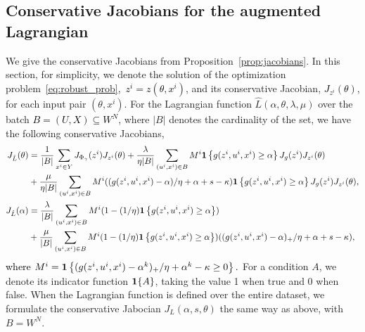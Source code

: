 \documentclass[11pt]{article}
\newcommand{\bsnote}[1]{\noindent\textcolor{red}{\texttt{Bartolomeo: #1}}}
\newcommand{\RC}[1]{\textcolor{black}{#1}}
\begin{document}
\begin{appendices}

\section{Conservative Jacobians for the augmented Lagrangian}
\label{appx:jacobians}
We give the conservative Jacobians from Proposition~\ref{prop:jacobians}. 
In this section, for simplicity,  we denote the solution of the optimization problem~\eqref{eq:robust_prob},~\RC{$z^i = z(\theta,x^i)$}, and its conservative Jacobian, \RC{$ J_{z^i}(\theta)$}, for each input pair $(\theta, x^i)$. 
For the Lagrangian function $\hat{L}(\alpha,\theta,\lambda, \mu)$ over the batch \RC{$B = (U,X) \subseteq W^N$}, where $|B|$ denotes the cardinality of the set, we have the following conservative Jacobians,
\RC{\allowdisplaybreaks \begin{align*}
J_{\hat{L}}(\theta) &= \frac{1}{|B|}\sum_{x^i \in Y} J_{\Phi_{\gamma}}(z^i)J_{z^i}(\theta) + \frac{\lambda}{\eta |B|}\sum_{(u^i,x^i)\in B}   M^i\mathbf 1\left\{g(z^i,u^i,x^i) \geq \alpha\right\} J_{g}(z^i)J_{z^i}(\theta) \\
&+ \frac{\mu}{\eta|B|}\sum_{(u^i,x^i)\in B} M^i((g(z^i,u^i,x^i)- \alpha)/\eta + \alpha+s-\kappa)\mathbf 1\left\{g(z^i,u^i,x^i) \geq \alpha\right\}J_{g}(z^i)J_{z^i}(\theta) ,\\
J_{\hat{L}}(\alpha) &= \frac{ \lambda}{|B|}\sum_{(u^i,x^i)\in B} M^i(1 - (1/\eta)\mathbf 1\left\{g(z^i,u^i,x^i) \geq \alpha\right\})\\
&+ \frac{\mu}{|B|}\sum_{(u^i,x^i)\in B}  M^i (1 - (1/\eta)\mathbf 1\left\{g(z^i,u^i,x^i) \geq \alpha\right\} ) ((g(z^i,u^i,x^i)- \alpha)_+/\eta + \alpha +s-\kappa),
\end{align*}}
\RC{where $M^i = \mathbf 1\left\{(g(z^i,u^i,x^i) - \alpha^k)_+/\eta + \alpha^k - \kappa \geq 0\right\}.$} For a condition $A$, we denote its indicator function $\mathbf 1\{A\}$, taking the value 1 when true and 0 when false. 
When the Lagrangian function is defined over the entire dataset, we formulate the conservative Jabocian $J_L(\alpha,s,\theta)$ the same way as above, with $B = W^N$.


\end{appendices}
\end{document}
